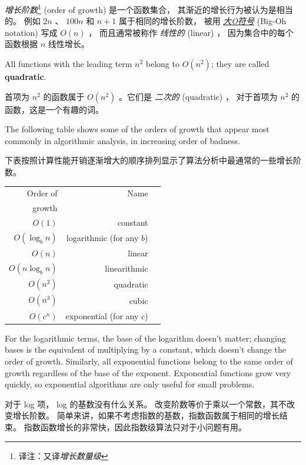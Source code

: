 {\em 增长阶数}\footnote{译注：又译{\em 增长数量级}} (order of growth) 是一个函数集合， 其渐近的增长行为被认为是相当的。
例如 $2n$ 、 $100n$ 和 $n+1$ 属于相同的增长阶数，
被用 \href{https://zh.wikipedia.org/wiki/%E5%A4%A7O%E7%AC%A6%E5%8F%B7}{{\em 大{\em O}符号}} (Big-Oh notation) 写成 $O(n)$ ，
而且通常被称作 {\em 线性的} (linear) ，
因为集合中的每个函数根据 $n$ 线性增长。
  

All functions with the leading term $n^2$ belong to $O(n^2)$; they are
called {\bf quadratic}.

首项为 $n^2$ 的函数属于 $O(n^2)$ 。它们是 {\em 二次的} (quadratic) ，
对于首项为 $n^2$ 的函数，这是一个有趣的词。

The following table shows some of the orders of growth that
appear most commonly in algorithmic analysis,
in increasing order of badness.

下表按照计算性能开销逐渐增大的顺序排列显示了算法分析中最通常的一些增长阶数。

\begin{tabular}{|r|r|r|}
\hline
Order of     &   Name      \\
growth       &               \\
\hline
$O(1)$             & constant \\
$O(\log_b n)$      & logarithmic (for any $b$) \\
$O(n)$             & linear \\
$O(n \log_b n)$    & linearithmic \\
$O(n^2)$           & quadratic     \\
$O(n^3)$           & cubic     \\
$O(c^n)$           & exponential (for any $c$)    \\
\hline
\end{tabular}

For the logarithmic terms, the base of the logarithm doesn't matter;
changing bases is the equivalent of multiplying by a constant, which
doesn't change the order of growth.  Similarly, all exponential
functions belong to the same order of growth regardless of the base of
the exponent. Exponential functions grow very quickly, so exponential algorithms are only useful for small problems.

对于 log 项， log 的基数没有什么关系。
改变阶数等价于乘以一个常数，其不改变增长阶数。
简单来讲，如果不考虑指数的基数，指数函数属于相同的增长结束。
指数函数增长的非常快，因此指数级算法只对于小问题有用。
  


